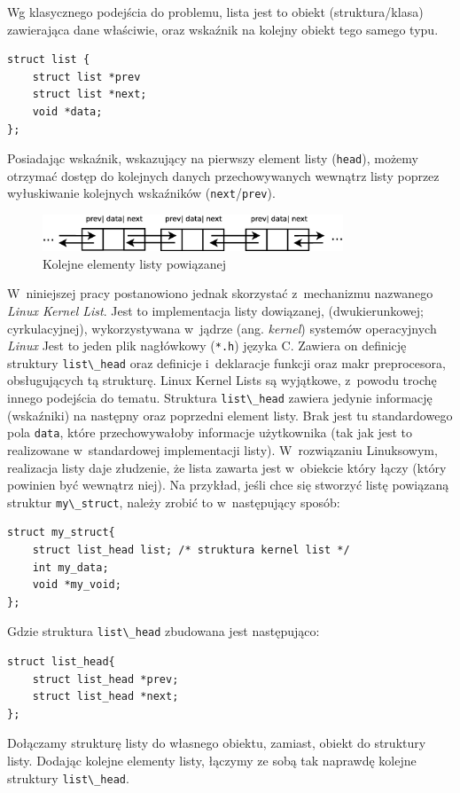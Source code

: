 \documentclass[a4paper,12pt,polish,oneside]{thesis}
\newcommand\code[1]{\lstinline[style=line]{#1}}
\begin{document}
Wg klasycznego podejścia do problemu, lista jest to obiekt (struktura/klasa) zawierająca dane właściwie, oraz wskaźnik na kolejny obiekt tego samego typu.
\begin{lstlisting}[style=code,caption=Idea listy powiązanej w~C]
struct list {
	struct list *prev
	struct list *next;
	void *data;
};
\end{lstlisting}
Posiadając wskaźnik, wskazujący na pierwszy element listy (\code{head}), możemy otrzymać dostęp do kolejnych danych przechowywanych wewnątrz listy poprzez wyłuskiwanie kolejnych wskaźników (\code{next}/\code{prev}).

\begin{figure}[htb]
	\begin{center}
		\includegraphics[width=0.80\textwidth]{linkedlist.eps}
		\caption{Kolejne elementy listy powiązanej}
	\end{center}
\end{figure}


W~niniejszej pracy postanowiono jednak skorzystać z~mechanizmu nazwanego \emph{Linux Kernel List}.
Jest to implementacja listy dowiązanej, (dwukierunkowej; cyrkulacyjnej), wykorzystywana w~jądrze (ang. \emph{kernel}) systemów operacyjnych \emph{Linux}
Jest to jeden plik nagłówkowy (\code{*.h}) języka C.
Zawiera on definicję struktury \code{list\_head} oraz definicje i~deklaracje funkcji oraz makr preprocesora, obsługujących tą strukturę.
Linux Kernel Lists są wyjątkowe, z~powodu trochę innego podejścia do tematu.
Struktura \code{list\_head} zawiera jedynie informację (wskaźniki) na następny oraz poprzedni element listy.
Brak jest tu standardowego pola \code{data}, które przechowywałoby informacje użytkownika (tak jak jest to realizowane w~standardowej implementacji listy).
W~rozwiązaniu Linuksowym, realizacja listy daje złudzenie, że lista zawarta jest w~obiekcie który łączy (który powinien być wewnątrz niej).
Na przykład, jeśli chce się stworzyć listę powiązaną struktur \code{my\_struct}, należy zrobić to w~następujący sposób:
\begin{lstlisting}[style=code,caption=Przykład tworzenia listy powiązanej za pomocą Kernel Lined List]
struct my_struct{
	struct list_head list; /* struktura kernel list */
	int my_data;
	void *my_void;
};
\end{lstlisting}
Gdzie struktura \code{list\_head} zbudowana jest następująco:
\begin{lstlisting}[style=code]
struct list_head{
	struct list_head *prev;
	struct list_head *next;
};
\end{lstlisting}
Dołączamy strukturę listy do własnego obiektu, zamiast, obiekt do struktury listy.
Dodając kolejne elementy listy, łączymy ze sobą tak naprawdę kolejne struktury \code{list\_head}.
\end{document}
